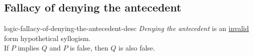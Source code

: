 \documentclass[preview]{standalone}
\begin{document}

\subsection{Fallacy of denying the antecedent}

\begin{snippet}{logic-fallacy-of-denying-the-antecedent-desc}
    \textit{Denying the antecedent}
    is an \underline{invalid} form hypothetical syllogism. \\
    If \(P\) implies \(Q\) and \(P\) is false, then \(Q\) is also false.
\end{snippet}

\end{document}
